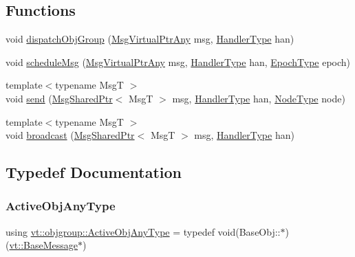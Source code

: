 \subsection*{Functions}
\begin{DoxyCompactItemize}
\item 
void \hyperlink{namespacevt_1_1objgroup_a84e8b7c3ea793b3446eb95433bf02179}{dispatch\+Obj\+Group} (\hyperlink{namespacevt_a54674b9f819f4f3a652c6f78d9b62aaf}{Msg\+Virtual\+Ptr\+Any} msg, \hyperlink{namespacevt_af64846b57dfcaf104da3ef6967917573}{Handler\+Type} han)
\item 
void \hyperlink{namespacevt_1_1objgroup_a7beec0700b3e4d81e0ea31027b445ecf}{schedule\+Msg} (\hyperlink{namespacevt_a54674b9f819f4f3a652c6f78d9b62aaf}{Msg\+Virtual\+Ptr\+Any} msg, \hyperlink{namespacevt_af64846b57dfcaf104da3ef6967917573}{Handler\+Type} han, \hyperlink{namespacevt_a985a5adf291c34a3ca263b3378388236}{Epoch\+Type} epoch)
\item 
{\footnotesize template$<$typename MsgT $>$ }\\void \hyperlink{namespacevt_1_1objgroup_aa2e134493c6b8a23d7d5e86bd9df1a70}{send} (\hyperlink{namespacevt_ab2b3d506ec8e8d1540aede826d84a239}{Msg\+Shared\+Ptr}$<$ MsgT $>$ msg, \hyperlink{namespacevt_af64846b57dfcaf104da3ef6967917573}{Handler\+Type} han, \hyperlink{namespacevt_a866da9d0efc19c0a1ce79e9e492f47e2}{Node\+Type} node)
\item 
{\footnotesize template$<$typename MsgT $>$ }\\void \hyperlink{namespacevt_1_1objgroup_a1e6ef433bb1132944aba030b2a48d12d}{broadcast} (\hyperlink{namespacevt_ab2b3d506ec8e8d1540aede826d84a239}{Msg\+Shared\+Ptr}$<$ MsgT $>$ msg, \hyperlink{namespacevt_af64846b57dfcaf104da3ef6967917573}{Handler\+Type} han)
\end{DoxyCompactItemize}


\subsection{Typedef Documentation}
\mbox{\label{namespacevt_1_1objgroup_a25bec5d3c8e8bb02b62280eec62b8ac7}} 
\subsubsection{\texorpdfstring{Active\+Obj\+Any\+Type}{ActiveObjAnyType}}
{\footnotesize\ttfamily using \hyperlink{namespacevt_1_1objgroup_a25bec5d3c8e8bb02b62280eec62b8ac7}{vt\+::objgroup\+::\+Active\+Obj\+Any\+Type} = typedef void(Base\+Obj\+::$\ast$)(\hyperlink{namespacevt_ac34f95a5e2b8109b55bfba52b074443d}{vt\+::\+Base\+Message}$\ast$)}

